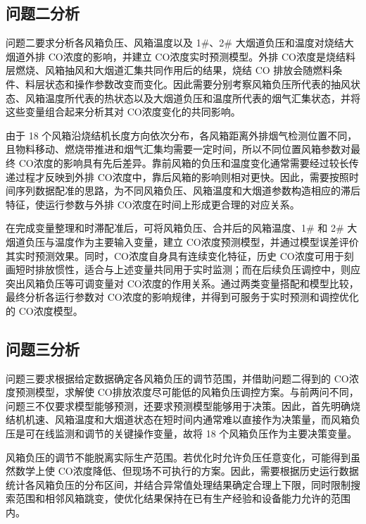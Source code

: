 \documentclass[UTF8,a4paper,zihao=-4]{ctexart}
\newcommand{\CO}{CO}
\begin{document}
\subsection{问题二分析}

问题二要求分析各风箱负压、风箱温度以及 1\#、2\# 大烟道负压和温度对烧结大烟道外排 \CO 浓度的影响，并建立 \CO 浓度实时预测模型。外排 \CO 浓度是烧结料层燃烧、风箱抽风和大烟道汇集共同作用后的结果，烧结 CO 排放会随燃料条件、料层状态和操作参数改变而变化\cite{li2023conox}。因此需要分别考察风箱负压所代表的抽风状态、风箱温度所代表的热状态以及大烟道负压和温度所代表的烟气汇集状态，并将这些变量组合起来分析其对 \CO 浓度变化的共同影响。

由于 18 个风箱沿烧结机长度方向依次分布，各风箱距离外排烟气检测位置不同，且物料移动、燃烧带推进和烟气汇集均需要一定时间，所以不同位置风箱参数对最终 \CO 浓度的影响具有先后差异。靠前风箱的负压和温度变化通常需要经过较长传递过程才反映到外排 \CO 浓度中，靠后风箱的影响则相对更快。因此，需要按照时间序列数据配准的思路，为不同风箱负压、风箱温度和大烟道参数构造相应的滞后特征，使运行参数与外排 \CO 浓度在时间上形成更合理的对应关系\cite{openai2026codex}。

在完成变量整理和时滞配准后，可将风箱负压、合并后的风箱温度、1\# 和 2\# 大烟道负压与温度作为主要输入变量，建立 \CO 浓度预测模型，并通过模型误差评价其实时预测效果。同时，\CO 浓度自身具有连续变化特征，历史 \CO 浓度可用于刻画短时排放惯性，适合与上述变量共同用于实时监测；而在后续负压调控中，则应突出风箱负压等可调变量对 \CO 浓度的作用关系。通过两类变量搭配和模型比较，最终分析各运行参数对 \CO 浓度的影响规律，并得到可服务于实时预测和调控优化的 \CO 浓度模型。

\subsection{问题三分析}

问题三要求根据给定数据确定各风箱负压的调节范围，并借助问题二得到的 \CO 浓度预测模型，求解使 \CO 排放浓度尽可能低的风箱负压调控方案。与前两问不同，问题三不仅要求模型能够预测，还要求预测模型能够用于决策。因此，首先明确烧结机机速、风箱温度和大烟道状态在短时间内通常难以直接作为决策量，而风箱负压是可在线监测和调节的关键操作变量，故将 18 个风箱负压作为主要决策变量。

风箱负压的调节不能脱离实际生产范围。若优化时允许负压任意变化，可能得到虽然数学上使 \CO 浓度降低、但现场不可执行的方案。因此，需要根据历史运行数据统计各风箱负压的分布区间，并结合异常值处理结果确定合理上下限，同时限制搜索范围和相邻风箱跳变，使优化结果保持在已有生产经验和设备能力允许的范围内。
\end{document}
